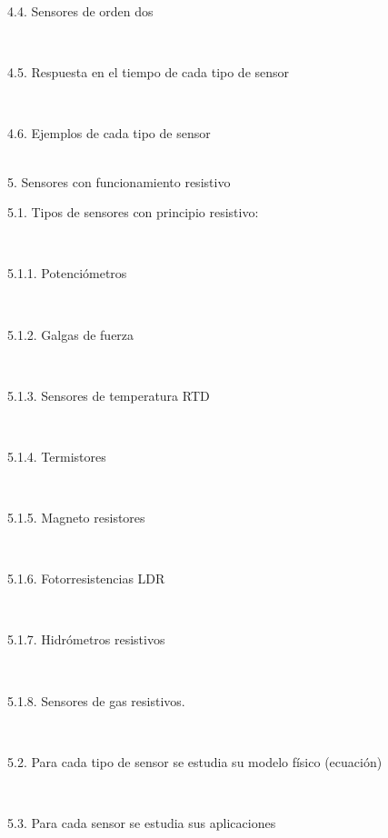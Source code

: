 \documentclass[letterpaper]{article}%
\begin{document}
\begin{tcolorbox}
\hspace*{0.02\linewidth}\parbox{0.98\linewidth}{\strut 4.4. Sensores de orden dos \strut}\\
\hspace*{0.02\linewidth}\parbox{0.98\linewidth}{\strut 4.5. Respuesta en el tiempo  de cada tipo de sensor\strut}\\
\hspace*{0.02\linewidth}\parbox{0.98\linewidth}{\strut 4.6. Ejemplos de cada tipo de sensor\strut}\\
5. Sensores con funcionamiento resistivo\\
\hspace*{0.02\linewidth}\parbox{0.98\linewidth}{\strut 5.1. Tipos de sensores con principio resistivo:\strut}\\
\hspace*{0.04\linewidth}\parbox{0.96\linewidth}{\strut 5.1.1. Potenciómetros\strut}\\
\hspace*{0.04\linewidth}\parbox{0.96\linewidth}{\strut 5.1.2. Galgas de fuerza\strut}\\
\hspace*{0.04\linewidth}\parbox{0.96\linewidth}{\strut 5.1.3. Sensores de temperatura RTD\strut}\\
\hspace*{0.04\linewidth}\parbox{0.96\linewidth}{\strut 5.1.4. Termistores\strut}\\
\hspace*{0.04\linewidth}\parbox{0.96\linewidth}{\strut 5.1.5. Magneto resistores\strut}\\
\hspace*{0.04\linewidth}\parbox{0.96\linewidth}{\strut 5.1.6. Fotorresistencias LDR\strut}\\
\hspace*{0.04\linewidth}\parbox{0.96\linewidth}{\strut 5.1.7. Hidrómetros resistivos\strut}\\
\hspace*{0.04\linewidth}\parbox{0.96\linewidth}{\strut 5.1.8. Sensores de gas resistivos.\strut}\\
\hspace*{0.02\linewidth}\parbox{0.98\linewidth}{\strut 5.2. Para cada tipo de sensor se estudia su modelo físico (ecuación)\strut}\\
\hspace*{0.02\linewidth}\parbox{0.98\linewidth}{\strut 5.3. Para cada sensor se estudia sus aplicaciones\strut}\\

\end{tcolorbox}
\end{document}
